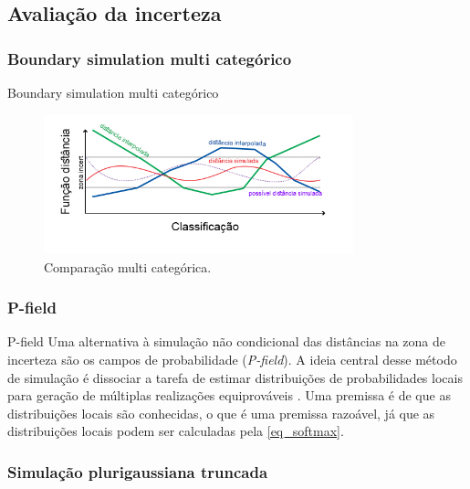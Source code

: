 \documentclass[aspectratio=169]{beamer}
\begin{document}
\subsection{Avaliação da incerteza}

\subsubsection{Boundary simulation multi categórico}

\begin{frame}{Boundary simulation multi categórico}
	\begin{figure}[H]
		\caption{\label{comp_multi}Comparação multi categórica.}
		\begin{center}
			\includegraphics[width=0.8\textwidth]{capitulo_3/classificacao_multi.jpg}
		\end{center}
	\end{figure}
\end{frame}

\subsubsection{P-field}

\begin{frame}{P-field}
	Uma alternativa à simulação não condicional das distâncias na zona de incerteza são os campos de probabilidade (\textit{P-field}). A ideia central desse método de simulação é dissociar a tarefa de estimar distribuições de probabilidades locais para geração de múltiplas realizações equiprováveis \cite{froidevaux1993probability}. Uma premissa é de que as distribuições locais são conhecidas, o que é uma premissa razoável, já que as distribuições locais podem ser calculadas pela \autoref{eq_softmax}.
\end{frame}

\subsubsection{Simulação plurigaussiana truncada}
\end{document}
